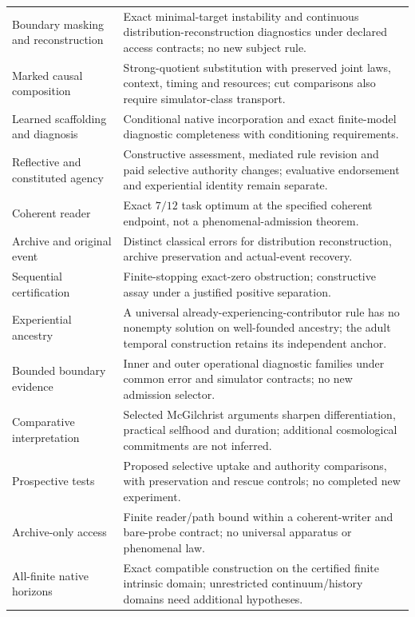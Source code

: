 \begin{longtable}{@{}p{}p{}@{}}
Boundary masking and reconstruction & Exact minimal-target instability and continuous distribution-reconstruction diagnostics under declared access contracts; no new subject rule.\\
Marked causal composition & Strong-quotient substitution with preserved joint laws, context, timing and resources; cut comparisons also require simulator-class transport.\\
Learned scaffolding and diagnosis & Conditional native incorporation and exact finite-model diagnostic completeness with conditioning requirements.\\
Reflective and constituted agency & Constructive assessment, mediated rule revision and paid selective authority changes; evaluative endorsement and experiential identity remain separate.\\
Coherent reader & Exact $7/12$ task optimum at the specified coherent endpoint, not a phenomenal-admission theorem.\\
Archive and original event & Distinct classical errors for distribution reconstruction, archive preservation and actual-event recovery.\\
Sequential certification & Finite-stopping exact-zero obstruction; constructive assay under a justified positive separation.\\
Experiential ancestry & A universal already-experiencing-contributor rule has no nonempty solution on well-founded ancestry; the adult temporal construction retains its independent anchor.\\
Bounded boundary evidence & Inner and outer operational diagnostic families under common error and simulator contracts; no new admission selector.\\
Comparative interpretation & Selected McGilchrist arguments sharpen differentiation, practical selfhood and duration; additional cosmological commitments are not inferred.\\
Prospective tests & Proposed selective uptake and authority comparisons, with preservation and rescue controls; no completed new experiment.\\
Archive-only access & Finite reader/path bound within a coherent-writer and bare-probe contract; no universal apparatus or phenomenal law.\\
All-finite native horizons & Exact compatible construction on the certified finite intrinsic domain; unrestricted continuum/history domains need additional hypotheses.\\
\bottomrule
\end{longtable}

